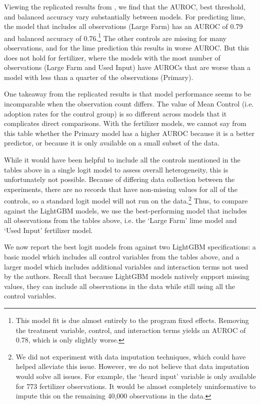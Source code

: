 \documentclass[12pt]{article}
\begin{document}



Viewing the replicated results from \textcite{fabregas_digital_2025}, we find that the AUROC, best threshold, and balanced accuracy vary substantially between models. For predicting lime, the model that includes all observations (Large Farm) has an AUROC of 0.79 and balanced accuracy of 0.76.\footnote{This model fit is due almost entirely to the program fixed effects. Removing the treatment variable, control, and interaction terms yields an AUROC of 0.78, which is only slightly worse.} The other controls are missing for many observations, and for the lime prediction this results in worse AUROC. But this does not hold for fertilizer, where the models with the most number of observations (Large Farm and Used Input) have AUROCs that are worse than a model with less than a quarter of the observations (Primary).

One takeaway from the replicated results is that model performance seems to be incomparable when the observation count differs. The value of Mean Control (i.e. adoption rates for the control group) is so different across models that it complicates direct comparisons. With the fertilizer models, we cannot say from this table whether the Primary model has a higher AUROC because it is a better predictor, or because it is only available on a small subset of the data.

While it would have been helpful to include all the controls mentioned in the tables above in a single logit model to assess overall heterogeneity, this is unfortunately not possible. Because of differing data collection between the experiments, there are no records that have non-missing values for all of the controls, so a standard logit model will not run on the data.\footnote{We did not experiment with data imputation techniques, which could have helped alleviate this issue. However, we do not believe that data imputation would solve all issues. For example, the `heard input' variable is only available for 773 fertilizer observations. It would be almost completely uninformative to impute this on the remaining 40,000 observations in the data.} Thus, to compare against the LightGBM models, we use the best-performing model that includes all observations from the tables above, i.e. the `Large Farm' lime model and `Used Input' fertilizer model.

We now report the best logit models from \textcite{fabregas_digital_2025} against two LightGBM specifications: a basic model which includes all control variables from the tables above, and a larger model which includes additional variables and interaction terms not used by the authors. Recall that because LightGBM models natively support missing values, they can include all observations in the data while still using all the control variables.
\end{document}
